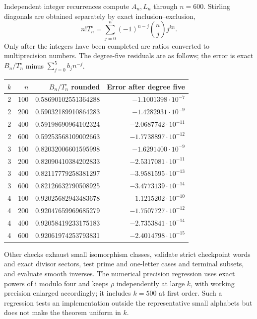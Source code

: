 \documentclass[11pt,letterpaper]{article}
\theoremstyle{remark}\newtheorem{remark}[theorem]{Remark}
\numberwithin{equation}{section}
\newcommand{\ii}{\mathrm i}
\begin{document}
Independent integer recurrences compute $A_n,L_n$ through $n=600$. Stirling diagonals are obtained separately by exact inclusion--exclusion,
\[
 n!T^{\circ}_n=\sum_{j=0}^n(-1)^{n-j}\binom nj j^{kn}.
\]
Only after the integers have been completed are ratios converted to multiprecision numbers. The degree-five residuals are as follows; the error is exact $B_n/T^{\circ}_n$ minus $\sum_{j=0}^5b_jn^{-j}$.
\begin{center}\small
\begin{tabular}{rrrr}
\toprule
$k$&$n$&$B_n/T^{\circ}_n$ rounded&Error after degree five\\
\midrule
2&100&0.58690102551364288&$-1.1001398\cdot10^{-7}$\\
2&200&0.59032189910864283&$-1.4282931\cdot10^{-9}$\\
2&400&0.59198690964102324&$-2.0687742\cdot10^{-11}$\\
2&600&0.59253568109002663&$-1.7738897\cdot10^{-12}$\\
3&100&0.82032006601595998&$-1.6291400\cdot10^{-9}$\\
3&200&0.82090410384202833&$-2.5317081\cdot10^{-11}$\\
3&400&0.82117779258381297&$-3.9581595\cdot10^{-13}$\\
3&600&0.82126632790508925&$-3.4773139\cdot10^{-14}$\\
4&100&0.92025682943483678&$-1.1215202\cdot10^{-10}$\\
4&200&0.92047659969685279&$-1.7507727\cdot10^{-12}$\\
4&400&0.92058419233175183&$-2.7353841\cdot10^{-14}$\\
4&600&0.92061974253793831&$-2.4014798\cdot10^{-15}$\\
\bottomrule
\end{tabular}
\end{center}
Other checks exhaust small isomorphism classes, validate strict checkpoint words and exact divisor sectors, test prime and one-letter cases and terminal subsets, and evaluate smooth inverses. The numerical precision regression uses exact powers of $\ii$ modulo four and keeps $\rho$ independently at large $k$, with working precision enlarged accordingly; it includes $k=500$ at first order. Such a regression tests an implementation outside the representative small alphabets but does not make the theorem uniform in $k$.
\end{document}

